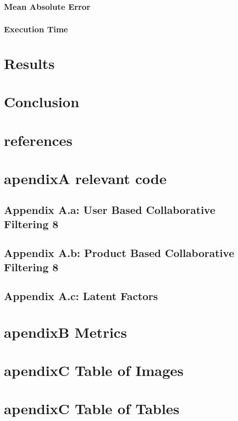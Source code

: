 \documentclass{article}
\begin{document}
\subsubsection{Mean Absolute Error}
\subsubsection{Execution Time}
\cite{ApacheSpark:1}
\cite{RecommenderSystems:2}
\cite{MovieLens:3}

\section{Results}
\section{Conclusion}
\section{references}
\section{apendixA relevant code}
\subsection{Appendix A.a: User Based Collaborative Filtering	8}
\subsection{Appendix A.b: Product Based Collaborative Filtering	8}
\subsection{Appendix A.c: Latent Factors}

\section{apendixB Metrics}
\section{apendixC Table of Images}
\section{apendixC Table of Tables}
\newpage


\end{document}
